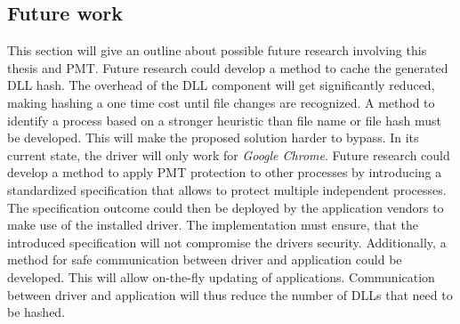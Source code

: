 \subsection{Future work}
This section will give an outline about possible future research involving this thesis and \gls{PMT}. Future research could develop a method to cache the generated \gls{DLL} hash. The overhead of the \gls{DLL} component will get significantly reduced, making hashing a one time cost until file changes are recognized. A method to identify a process based on a stronger heuristic than file name or file hash must be developed. This will make the proposed solution harder to bypass. In its current state, the driver will only work for \emph{Google Chrome}. Future research could develop a method to apply \gls{PMT} protection to other processes by introducing a standardized specification that allows to protect multiple independent processes. The specification outcome could then be deployed by the application vendors to make use of the installed driver. The implementation must ensure, that the introduced specification will not compromise the drivers security. Additionally, a method for safe communication between driver and application could be developed. This will allow on-the-fly updating of applications. Communication between driver and application will thus reduce the number of \glspl{DLL} that need to be hashed.